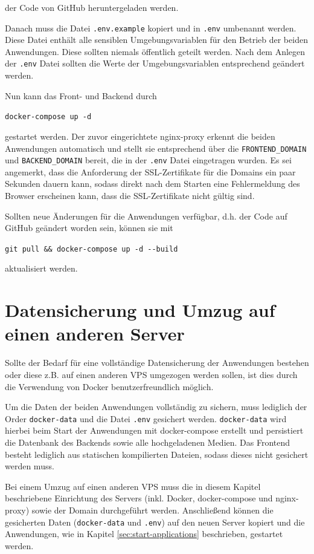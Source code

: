 der Code von GitHub heruntergeladen werden.

Danach muss die Datei \lstinline{.env.example} kopiert und in \lstinline{.env} umbenannt werden. Diese Datei enthält alle sensiblen Umgebungsvariablen für den Betrieb der beiden Anwendungen. Diese sollten niemals öffentlich geteilt werden. Nach dem Anlegen der \lstinline{.env} Datei sollten die Werte der Umgebungsvariablen entsprechend geändert werden.

Nun kann das Front- und Backend durch

\begin{center}
  \lstinline{docker-compose up -d}
\end{center}

gestartet werden. Der zuvor eingerichtete nginx-proxy erkennt die beiden Anwendungen automatisch und stellt sie entsprechend über die \lstinline{FRONTEND_DOMAIN} und \lstinline{BACKEND_DOMAIN} bereit, die in der \lstinline{.env} Datei eingetragen wurden. Es sei angemerkt, dass die Anforderung der SSL-Zertifikate für die Domains ein paar Sekunden dauern kann, sodass direkt nach dem Starten eine Fehlermeldung des Browser erscheinen kann, dass die SSL-Zertifikate nicht gültig sind.

Sollten neue Änderungen für die Anwendungen verfügbar, d.h. der Code auf GitHub geändert worden sein, können sie mit

\begin{center}
  \lstinline{git pull && docker-compose up -d --build}
\end{center}

aktualisiert werden.

\section{Datensicherung und Umzug auf einen anderen Server}
Sollte der Bedarf für eine vollständige Datensicherung der Anwendungen bestehen oder diese z.B. auf einen anderen \ac{VPS} umgezogen werden sollen, ist dies durch die Verwendung von Docker benutzerfreundlich möglich.

Um die Daten der beiden Anwendungen vollständig zu sichern, muss lediglich der Order \lstinline{docker-data} und die Datei \lstinline{.env} gesichert werden. \lstinline{docker-data} wird hierbei beim Start der Anwendungen mit docker-compose erstellt und persistiert die Datenbank des Backends sowie alle hochgeladenen Medien. Das Frontend besteht lediglich aus statischen kompilierten Dateien, sodass dieses nicht gesichert werden muss.

Bei einem Umzug auf einen anderen \ac{VPS} muss die in diesem Kapitel beschriebene Einrichtung des Servers (inkl. Docker, docker-compose und nginx-proxy) sowie der Domain durchgeführt werden. Anschließend können die gesicherten Daten (\lstinline{docker-data} und \lstinline{.env}) auf den neuen Server kopiert und die Anwendungen, wie in Kapitel \ref{sec:start-applications} beschrieben, gestartet werden.
